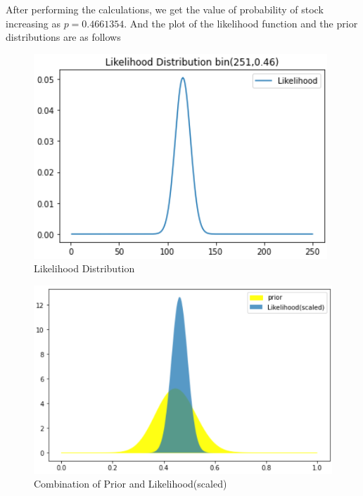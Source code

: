 \documentclass[conference]{IEEEtran}
\begin{document}
        After performing the calculations, we get the value of probability of stock increasing as $p = 0.4661354$. And the plot of the likelihood function and the prior distributions are  as follows
        \begin{figure}[htbp]
            \begin{center}
                \centerline{\includegraphics[scale=1]{Images/Likelihood_Dist.png}}
                \caption{Likelihood Distribution}
            \end{center}
        \end{figure}
        
        \begin{figure}[htbp]
            \begin{center}
                \centerline{\includegraphics[scale=.8]{Images/Prior_Likelihood.png}}
                \caption{Combination of Prior and Likelihood(scaled)}
            \end{center}
        \end{figure}
    
\end{document}

